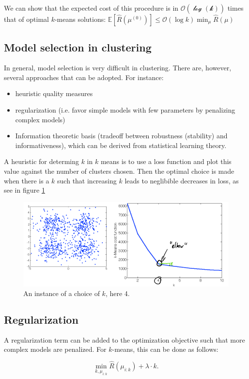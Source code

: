 \documentclass[a4paper,10pt,twoside]{article}
\begin{document}
We can show that the expected cost of this procedure is in $\mathcal{O(\log(k))}$ times that of optimal $k$-means solutions: $\mathbb{E}[\hat{R}(\mu^{(0)})]\leq\mathcal{O}(\log k)\min_{\mu}\hat{R}(\mu)$

\subsection{Model selection in clustering}

In general, model selection is very difficult in clustering. There are, however, several approaches that can be adopted. For instance:
\begin{itemize}
    \item heuristic quality measures
    \item regularization (i.e. favor simple models with few parameters by penalizing complex models)
    \item Information theoretic basis (tradeoff between robustness (stability) and informativeness), which can be derived from statistical learning theory.
\end{itemize}

A heuristic for determing $k$ in $k$ means is to use a loss function and plot this value against the number of clusters chosen. Then the optimal choice is made when there is a $k$ such that increasing $k$ leads to neglibible decreases in loss, as see in figure \ref{choice-of-k}

\begin{figure}[]
    \centering
    \includegraphics[width=.5\textwidth]{figures/choice-of-k.png}
    \caption{An instance of a choice of $k$, here 4.}
    \label{choice-of-k}
\end{figure}

\subsection{Regularization}

A regularization term can be added to the optimization objective such that more complex models are penalized. For $k$-means, this can be done as follows:

\begin{equation*}
    \min_{k, \mu_{i:k}}\hat{R}(\mu_{i:k})+\lambda\cdot k.
\end{equation*}
\end{document}
